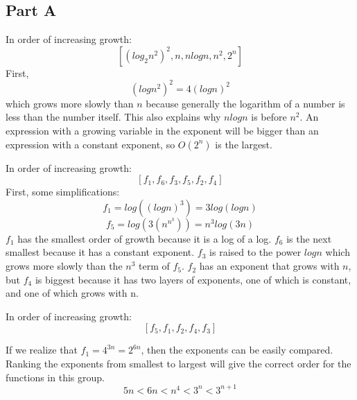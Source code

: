 \documentclass[12pt,twoside]{article}
\begin{document}

\begin{problems}

\section*{Part A}

\problem  %

\begin{problemparts}
\problempart In order of increasing growth: $$[(log_2n^2)^2, n, nlogn,  n^2, 2^n ]$$
First,
$$(logn^2)^2 = 4(logn)^2$$ which grows more slowly than $n$ because generally the logarithm of a number is less than the number itself. This also explains why $nlogn$ is before $n^2$. An expression with a growing variable in the exponent will be bigger than an expression with a constant exponent, so $O(2^n)$ is the largest.

\problempart In order of increasing growth: $$[f_1, f_6, f_3, f_5, f_2, f_4]$$
First, some simplifications:
$$f_1 = log((logn)^3) = 3log(logn)$$
$$f_5 = log(3(n^{n^3})) = n^3log(3n)$$
$f_1$ has the smallest order of growth because it is a log of a log. $f_6$ is the next smallest because it has a constant exponent. $f_3$ is raised to the power $logn$ which grows more slowly than the $n^3$ term of  $f_5$. $f_2$ has an exponent that grows with $n$, but $f_4$ is biggest because it has two layers of exponents, one of which is constant, and one of which grows with n.

\problempart In order of increasing growth: $$[f_5, f_1, f_2, f_4, f_3]$$

If we realize that $f_1 = 4^{3n} = 2^{6n}$, then the exponents can be easily compared. Ranking the exponents from smallest to largest will give the correct order for the functions in this group. $$ 5n < 6n < n^4 < 3^n < 3^{n+1} $$
\end{problemparts}



\problem  %

\begin{problemparts}


\end{problemparts}
\end{problems}
\end{document}
